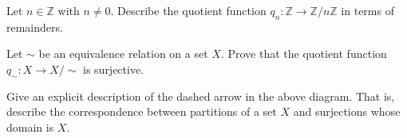 \begin{exercise}
Let $n \in \mathbb{Z}$ with $n \ne 0$. Describe the quotient function $q_n : \mathbb{Z} \to \mathbb{Z}/n\mathbb{Z}$ in terms of remainders.
\end{exercise}

\begin{exercise}
\label{exQuotientFunctionIsSurjective}
Let $\sim$ be an equivalence relation on a set $X$. Prove that the quotient function $q_{\sim} : X \to X/{\sim}$ is surjective.
\end{exercise}


\begin{exercise}
Give an explicit description of the dashed arrow in the above diagram. That is, describe the correspondence between partitions of a set $X$ and surjections whose domain is $X$.
\end{exercise}

